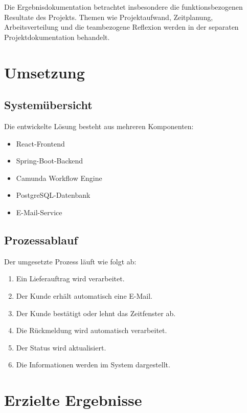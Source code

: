 \documentclass[
12pt,
a4paper
]{article}
\begin{document}
Die Ergebnisdokumentation betrachtet insbesondere die
funktionsbezogenen Resultate des Projekts. Themen wie
Projektaufwand, Zeitplanung, Arbeitsverteilung und die
teambezogene Reflexion werden in der separaten
Projektdokumentation behandelt.

\section{Umsetzung}

\subsection{Systemübersicht}

Die entwickelte Lösung besteht aus mehreren Komponenten:

\begin{itemize}
    \item React-Frontend
    \item Spring-Boot-Backend
    \item Camunda Workflow Engine
    \item PostgreSQL-Datenbank
    \item E-Mail-Service
\end{itemize}

\subsection{Prozessablauf}

Der umgesetzte Prozess läuft wie folgt ab:

\begin{enumerate}
    \item Ein Lieferauftrag wird verarbeitet.
    \item Der Kunde erhält automatisch eine E-Mail.
    \item Der Kunde bestätigt oder lehnt das Zeitfenster ab.
    \item Die Rückmeldung wird automatisch verarbeitet.
    \item Der Status wird aktualisiert.
    \item Die Informationen werden im System dargestellt.
\end{enumerate}

\section{Erzielte Ergebnisse}
\end{document}
